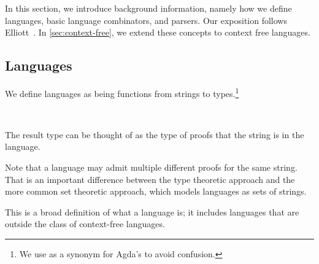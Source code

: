 In this section, we introduce background information, namely how we define languages, basic language combinators, and parsers. Our exposition follows Elliott~\cite{conal-languages}. In \cref{sec:context-free}, we extend these concepts to context free languages.

\subsection{Languages}

We define languages as being functions from strings to types.\footnote{We use  as a synonym for Agda's  to avoid confusion.}
\begin{code}[hide]%
\>[0]\AgdaSpace{}%
\AgdaSpace{}%
\<%
\\
\>[0][@{}l@{\AgdaIndent{0}}]%
\>[4]\AgdaSpace{}%
\AgdaSymbol{:}\AgdaSpace{}%
\<%
\end{code}
\begin{code}%
%
\>[4]\AgdaSpace{}%
\AgdaSymbol{=}\AgdaSpace{}%
\AgdaSpace{}%
\AgdaSpace{}%
\<%
\end{code}
The result type can be thought of as the type of proofs that the string is in the language.
\begin{remark}
Note that a language may admit multiple different proofs for the same string. That is an important difference between the type theoretic approach and the more common set theoretic approach, which models languages as sets of strings.
\end{remark}
This is a broad definition of what a language is; it includes languages that are outside the class of context-free languages. 
